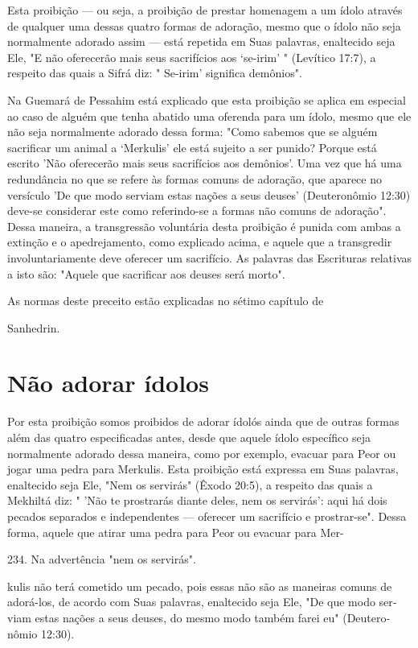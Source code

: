 \begin{itemize}
\begin{enumrate}
\begin{itemize}
\begin{itemize}
\begin{itemize}
Esta proibição --- ou seja, a proibição de prestar homenagem a um ídolo
através de qualquer uma dessas quatro formas de adoração, mesmo que o
ídolo não seja normalmente adorado assim --- está repetida em Suas
palavras, enaltecido seja Ele, "E não oferecerão mais seus sacrifícios
aos `se-irim' " (Leví­tico 17:7), a respeito das quais a Sifrá diz: "
Se-irim' significa demônios".

Na Guemará de Pessahim está explicado que esta proibição se aplica em
especial ao caso de alguém que tenha abatido uma oferenda para um ídolo,
mesmo que ele não seja normalmente adorado dessa forma: "Como sabemos
que se alguém sacrificar um animal a `Merkulis' ele está sujeito a ser
punido? Por­que está escrito 'Não oferecerão mais seus sacrifícios aos
demônios'. Uma vez que há uma redundância no que se refere às formas
comuns de adoração, que aparece no versículo 'De que modo serviam estas
nações a seus deuses' (Deute­ronômio 12:30) deve-se considerar este como
referindo-se a formas não comuns de adoração". Dessa maneira, a
transgressão voluntária desta proibição é puni­da com ambas a extinção e
o apedrejamento, como explicado acima, e aquele que a transgredir
involuntariamente deve oferecer um sacrifício. As palavras das
Escrituras relativas a isto são: "Aquele que sacrificar aos deuses será
morto".


As normas deste preceito estão explicadas no sétimo capítulo de


Sanhedrin.

\section{Não adorar ídolos}

Por esta proibição somos proibidos de adorar ídolós ainda que de outras
formas além das quatro especificadas antes, desde que aquele ídolo
es­pecífico seja normalmente adorado dessa maneira, como por exemplo,
evacuar para Peor ou jogar uma pedra para Merkulis. Esta proibição está
expressa em Suas palavras, enaltecido seja Ele, "Nem os servirás" (Êxodo
20:5), a respeito das quais a Mekhiltá diz: " 'Não te prostrarás diante
deles, nem os servirás': aqui há dois pecados separados e independentes
--- oferecer um sacrifício e prostrar-se". Dessa forma, aquele que
atirar uma pedra para Peor ou evacuar para Mer-

234. Na advertência "nem os servirás".


kulis não terá cometido um pecado, pois essas não são as maneiras comuns
de adorá-los, de acordo com Suas palavras, enaltecido seja Ele, "De que
modo ser­viam estas nações a seus deuses, do mesmo modo também farei eu"
(Deutero­nômio 12:30).


\end{itemize}
\end{itemize}
\end{itemize}
\end{enumrate}
\end{itemize}
